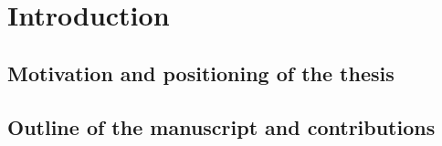 

\chapter{Introduction}




\section{Motivation and positioning of the thesis}


\section{Outline of the manuscript and contributions}

